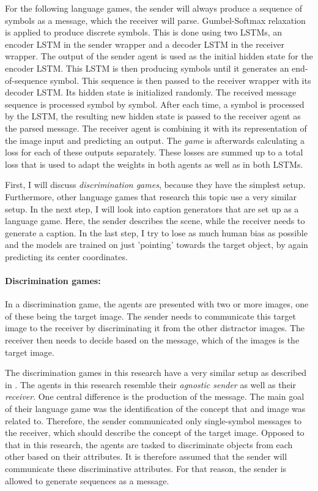 For the following language games, the sender will always produce a sequence of symbols as a message, which the receiver will parse.
Gumbel-Softmax relaxation is applied to produce discrete symbols.
This is done using two LSTMs, an encoder LSTM in the sender wrapper and a decoder LSTM in the receiver wrapper.
The output of the sender agent is used as the initial hidden state for the encoder LSTM.
This LSTM is then producing symbols until it generates an end-of-sequence symbol.
This sequence is then passed to the receiver wrapper with its decoder LSTM.
Its hidden state is initialized randomly.
The received message sequence is processed symbol by symbol.
After each time, a symbol is processed by the LSTM, the resulting new hidden state is passed to the receiver agent as the parsed message.
The receiver agent is combining it with its representation of the image input and predicting an output.
The \emph{game} is afterwards calculating a loss for each of these outputs separately.
These losses are summed up to a total loss that is used to adapt the weights in both agents as well as in both LSTMs.

First, I will discuss \emph{discrimination games}, because they have the simplest setup.
Furthermore, other language games that research this topic use a very similar setup.
In the next step, I will look into caption generators that are set up as a language game.
Here, the sender describes the scene, while the receiver needs to generate a caption.
In the last step, I try to lose as much human bias as possible and the models are trained on just 'pointing' towards the target object, by again predicting its center coordinates.

\paragraph{Discrimination games:}
In a discrimination game, the agents are presented with two or more images, one of these being the target image.
The sender needs to communicate this target image to the receiver by discriminating it from the other distractor images.
The receiver then needs to decide based on the message, which of the images is the target image.

The discrimination games in this research have a very similar setup as described in \citet{Lazaridou2016}.
The agents in this research resemble their \emph{agnostic sender} as well as their \emph{receiver}.
One central difference is the production of the message.
The main goal of their language game was the identification of the concept that and image was related to.
Therefore, the sender communicated only single-symbol messages to the receiver, which should describe the concept of the target image.
Opposed to that in this research, the agents are tasked to discriminate objects from each other based on their attributes.
It is therefore assumed that the sender will communicate these discriminative attributes.
For that reason, the sender is allowed to generate sequences as a message.

